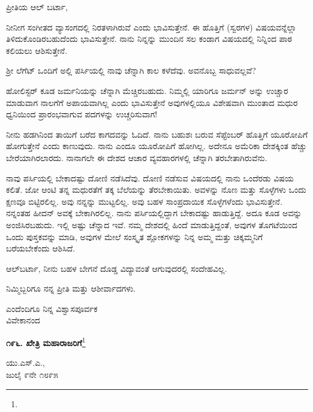 \noindent
ಪ್ರೀತಿಯ ಆಲ್ ಬರ್ಟಾ,

ನೀನೀಗ ಸಂಗೀತದ ವ್ಯಾಸಂಗದಲ್ಲಿ ನಿರತಳಾಗಿರುವೆ ಎಂದು ಭಾವಿಸುತ್ತೇನೆ. ಈ ಹೊತ್ತಿಗೆ  (ಸ್ವರಗಳ) ವಿಷಯವನ್ನೆಲ್ಲಾ ತಿಳಿದುಕೊಂಡಿರಬಹುದೆಂದು ಭಾವಿಸುತ್ತೇನೆ. ನಾನು ನಿನ್ನನ್ನು ಮುಂದಿನ ಸಲ ಕಂಡಾಗ  ವಿಷಯದಲ್ಲಿ ನಿನ್ನಿಂದ ಪಾಠ ಕಲಿಯಲು ಆಶಿಸುತ್ತೇನೆ.

ಶ‍್ರೀ ಲೆಗೆಟ್ ಒಂದಿಗೆ ಅಲ್ಲಿ ಪರ್ಸಿಯಲ್ಲಿ ನಾವು ಚೆನ್ನಾಗಿ ಕಾಲ ಕಳೆದೆವು. ಅವನೊಬ್ಬ ಸಾಧುವಲ್ಲವೆ?

ಹೋಲಿಸ್ಟರ್ ಕೂಡ ಜರ್ಮನಿಯನ್ನು ಚೆನ್ನಾಗಿ ಮೆಚ್ಚಿರಬಹುದು. ನಿಮ್ಮಲ್ಲಿ ಯಾರಿಗೂ ಜರ್ಮನ್‌ ಅನ್ನು ಉಚ್ಚಾರ ಮಾಡುವಾಗ ನಾಲಗೆಗೆ ಅಪಾಯವಾಗಿಲ್ಲ ಎಂದು ಭಾವಿಸುತ್ತೇನೆ\enginline{-} ಅವುಗಳಲ್ಲಿಯೂ ವಿಶೇಷವಾಗಿ  ಮುಂತಾದ ಮಧುರ ಧ್ವನಿಯಿಂದ ಪ್ರಾರಂಭವಾಗುವ ಪದಗಳನ್ನು ಉಚ್ಚರಿಸುವಾಗ!

ನೀನು ಹಡಗಿನಿಂದ ತಾಯಿಗೆ ಬರೆದ ಕಾಗದವನ್ನು ಓದಿದೆ. ನಾನು ಬಹುಶಃ ಬರುವ ಸೆಪ್ಟೆಂಬರ್‌ ಹೊತ್ತಿಗೆ ಯೂರೋಪಿಗೆ ಹೋಗುತ್ತೇನೆ ಎಂದು ಕಾಣುವುದು. ನಾನು ಎಂದೂ ಯೂರೋಪಿಗೆ ಹೋಗಿಲ್ಲ. ಅದೇನೂ ಅಮೆರಿಕಾ ದೇಶಕ್ಕಿಂತ ಹೆಚ್ಚು ಬೇರೆಯಾಗಿರಲಾರದು. ನಾನಾಗಲೇ ಈ ದೇಶದ ಆಚಾರ ವ್ಯವಹಾರಗಳಲ್ಲಿ ಚೆನ್ನಾಗಿ ತರಬೇತಾಗಿರುವೆನು.

ನಾವು ಪರ್ಸಿಯಲ್ಲಿ ಬೇಕಾದಷ್ಟು ದೋಣಿ ನಡೆಸಿದೆವು. ದೋಣಿ ನಡೆಸುವ ವಿಷಯದಲ್ಲಿ ನಾನು ಒಂದೆರಡು ವಿಷಯ ಕಲಿತೆ. ಜೋ ಆಂಟಿ ತನ್ನ ಮಧುರತೆಗೆ ತಕ್ಕ ಬೆಲೆಯನ್ನು ತೆರಬೇಕಾಯಿತು. ಅವಳನ್ನು ನೊಣ ಮತ್ತು ಸೊಳ್ಳೆಗಳು ಒಂದು ಕ್ಷಣವೂ ಬಿಟ್ಟಿರಲಿಲ್ಲ. ಅವು ನನ್ನನ್ನು ಮುಟ್ಟಲಿಲ್ಲ. ಅವು ಬಹಳ ಸಾಂಪ್ರದಾಯಿಕ ಸೊಳ್ಳೆಗಳೆಂದು ಭಾವಿಸುತ್ತೇನೆ. ನನ್ನಂತಹ ಹೀದನ್ ಅವಕ್ಕೆ ಬೇಕಾಗಿರಲಿಲ್ಲ. ನಾನು ಪರ್ಸಿಯಲ್ಲಿದ್ದಾಗ ಬೇಕಾದಷ್ಟು ಹಾಡುತ್ತಿದ್ದೆ. ಅದೂ ಕೂಡ ಅವನ್ನು ಅಂಜಿಸಿರಬಹುದು. ಇಲ್ಲಿ ಅಷ್ಟು ಚೆನ್ನಾದ  ಇವೆ. ನಮ್ಮ ದೇಶದಲ್ಲಿ ಹಿಂದೆ ಮಾಡುತ್ತಿದ್ದಂತೆ, ಅವುಗಳ ತೊಗಟೆಯಿಂದ ಒಂದು ಪುಸ್ತಕವನ್ನು ಮಾಡಿ, ಅವುಗಳ ಮೇಲೆ ಸಂಸ್ಕೃತ ಶ್ಲೋಕಗಳನ್ನು ನಿನ್ನ ಅಮ್ಮ ಮತ್ತು ಚಿಕ್ಕಮ್ಮನಿಗೆ ಬರೆಯಬೇಕೆಂದು ಆಶಿಸಿದೆ.

\eject

ಆಲ್‌ಬರ್ಟಾ, ನೀನು ಬಹಳ ಬೇಗನೆ ದೊಡ್ಡ ವಿದ್ಯಾವಂತೆ ಆಗುವುದರಲ್ಲಿ ಸಂದೇಹವಿಲ್ಲ.

ನಿಮ್ಮಿಬ್ಬರಿಗೂ ನನ್ನ ಪ್ರೀತಿ ಮತ್ತು ಆಶೀರ್ವಾದಗಳು.

{\flushright
ಎಂದೆಂದಿಗೂ ನಿನ್ನ ವಿಶ್ವಾಸಪೂರ್ವಕ\\ವಿವೇಕಾನಂದ\par}

\begin{center}
\textbf{೧೯೬. ಖೇತ್ರಿ ಮಹಾರಾಜರಿಗೆ}\footnote{}
\end{center}

\begin{flushright}
ಯು.ಎಸ್.ಎ.,\\ಜುಲೈ ೯ನೇ ೧೮೯೫
\end{flushright}

